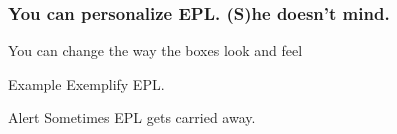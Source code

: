 \documentclass{beamer}
\begin{document}
\begin{frame}
	\frametitle{You can personalize EPL. (S)he doesn't mind.}
	
		\begin{theorem}[It's a theorem]
			You can change the way the boxes look and feel
		\end{theorem}
		
		\begin{exampleblock}{Example}
			Exemplify EPL.
		\end{exampleblock}
		
		\begin{alertblock}{Alert}
			Sometimes EPL gets carried away.
		\end{alertblock}
\end{frame}	
\end{document}
